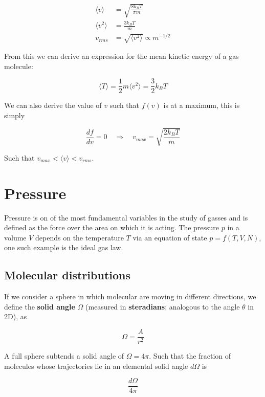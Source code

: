 \documentclass[a4paper]{article}
\begin{document}
\begin{align}
\langle v\rangle&=\sqrt{\frac{8k_BT}{\pi m}}\\[.5em]
\langle v^2\rangle&=\frac{3k_BT}{m}\\[.5em]
v_{rms}&=\sqrt{\langle v^2\rangle}\propto m^{-1/2}
\end{align}

From this we can derive an expression for the mean kinetic energy of a gas molecule:

\begin{equation}
	\langle T\rangle =\frac{1}{2}m\langle v^2\rangle=\frac{3}{2}k_BT
\end{equation}

We can also derive the value of $v$ such that $f(v)$ is at a maximum, this is simply

\begin{equation}
	\frac{df}{dv}=0\quad\Rightarrow\quad v_{max}=\sqrt{\frac{2k_BT}{m}}
\end{equation}

Such that $v_{max} < \langle v\rangle < v_{rms}$.

\section{Pressure}

Pressure is on of the most fundamental variables in the study of gasses and is defined as the force over the area on which it is acting. The pressure $p$ in a volume $V$ depends on the temperature $T$ via an equation of state $p=f(T,V,N)$, one such example is the ideal gas law.

\subsection{Molecular distributions}

If we consider a sphere in which molecular are moving in different directions, we define the \textbf{solid angle} $\Omega$ (measured in \textbf{steradians}; analogous to the angle $\theta$ in 2D), as

\begin{equation}
	\Omega=\frac{A}{r^2}
\end{equation}

A full sphere subtends a solid angle of $\Omega=4\pi$. Such that the fraction of molecules whose trajectories lie in an elemental solid angle $d\Omega$ is

\begin{equation}
	\frac{d\Omega}{4\pi}
\end{equation}
\end{document}
